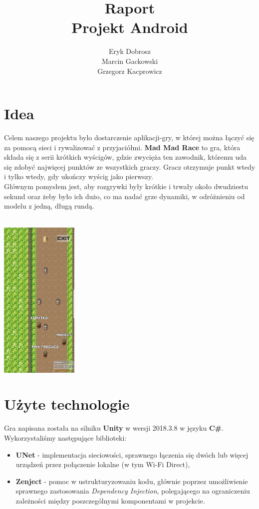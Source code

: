 \documentclass[]{report}
\begin{document}
\title{Raport\\
	\large Projekt Android}
\author{Eryk Dobrosz \\
	Marcin Gackowski \\
	Grzegorz Kacprowicz}

{\let\newpage\relax\maketitle}


\chapter*{Idea}
\quad Celem naszego projektu bylo dostarczenie aplikacji-gry, w której można łączyć się za pomocą sieci i rywalizować z przyjaciółmi. \textbf{Mad Mad Race} to gra, która składa się z serii krótkich wyścigów, gdzie zwycięża ten zawodnik, któremu uda się zdobyć najwięcej punktów ze wszystkich graczy. Gracz otrzymuje punkt wtedy i tylko wtedy, gdy ukończy wyścig jako pierwszy. \\
Głównym pomysłem jest, aby rozgrywki były krótkie i trwały około dwudziestu sekund oraz żeby było ich dużo, co ma nadać grze dynamiki, w odróżnieniu od modelu z jedną, długą rundą.\\\\

\begin{center}
	\includegraphics[width=0.28\textwidth]{g2.jpg}
\end{center}

\chapter*{Użyte technologie}
\quad Gra napisana została na silniku \textbf{Unity} w wersji 2018.3.8 w języku \textbf{C\#}. Wykorzystaliśmy następujące biblioteki:
\begin{itemize}
	\item \textbf{UNet} - implementacja sieciowości, sprawnego łączenia się dwóch lub więcej urządzeń przez połączenie lokalne (w tym Wi-Fi Direct),
	\item \textbf{Zenject} - pomoc w ustrukturyzowaniu kodu, głównie poprzez umożliwienie sprawnego zastosowania \textit{Dependency Injection}, polegającego na ograniczeniu zależności między poszczególnymi komponentami w projekcie.
\end{itemize}
\end{document}
